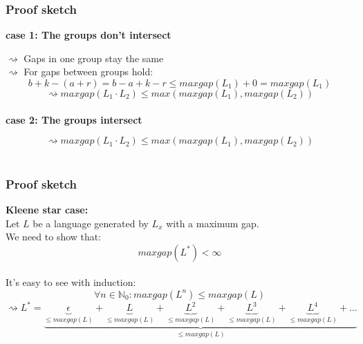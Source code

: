 \documentclass{beamer}
\begin{document}
\begin{frame}
  \frametitle{Proof sketch}
  {\bf case 1:  The groups don't intersect}\\
  \vspace{0.05cm}
  \begin{center}
  \end{center}
  $\rightsquigarrow $ Gaps in one group stay the same\\
  $\rightsquigarrow$ For gaps between groups hold: 
    \[b+k - (a+r) = b-a + k-r \le maxgap(L_1) + 0 = maxgap(L_1)\]
  \[\rightsquigarrow maxgap(L_1\cdot L_2) \le  max(maxgap(L_1),maxgap(L_2))\] \\
  \vspace{1cm}
  {\bf case 2:  The groups intersect}\\
  \vspace{0.05cm}
  \begin{center}
  \end{center}
  \[\rightsquigarrow maxgap(L_1\cdot L_2) \le max(maxgap(L_1), maxgap(L_2))\] \\
\end{frame}
\begin{frame}
  \frametitle{Proof sketch}
  {\bf Kleene star case:}\\
  Let $L$ be a language generated by $L_x$ with a maximum gap.\\
  We need to show that: 
  \[ maxgap(L^*) < \infty \]\\
  \vspace{1cm}
  It's easy to see with induction: 
  \[\forall n \in \mathbb{N}_0: maxgap(L^n) \le maxgap(L)\]
  \vspace{0.5cm}
  \[\rightsquigarrow L^* = \underbrace{
      \underbrace{\epsilon}_{\le maxgap(L)} +
      \underbrace{L}_{\le maxgap(L)} +
      \underbrace{L^2}_{\le maxgap(L)} +
      \underbrace{L^3}_{\le maxgap(L)}+ 
      \underbrace{L^4}_{\le maxgap(L)} + \dots
    }_{\le maxgap(L)}\]
  \vspace{0.05cm}
\end{frame}
\end{document}
